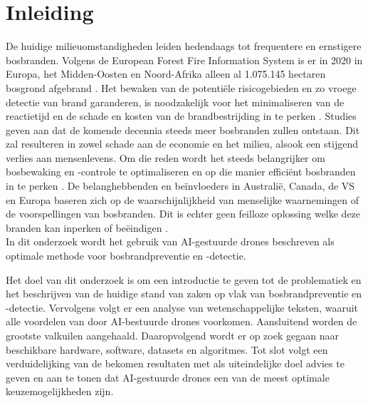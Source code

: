 \documentclass{hogent-article}
\affiliation{
  \textsuperscript{1} \href{mailto:stef.boerjan@student.hogent.be}{stef.boerjan@student.hogent.be}}
\begin{document}
\flushbottom %
\maketitle %
\tableofcontents %
\thispagestyle{empty} %


\section{Inleiding}
De huidige milieuomstandigheden leiden hedendaags tot frequentere en ernstigere bosbranden. Volgens de European Forest Fire Information System is er in 2020 in Europa, het Midden-Oosten en Noord-Afrika alleen al 1.075.145 hectaren bosgrond afgebrand \autocite{Centre2021}. Het bewaken van de potentiële risicogebieden en zo vroege detectie van brand garanderen, is noodzakelijk voor het minimaliseren van de reactietijd en de schade en kosten van de brandbestrijding in te perken \autocite{Alkhatib2014}. Studies geven aan dat de komende decennia steeds meer bosbranden zullen ontstaan. Dit zal resulteren in zowel schade aan de economie en het milieu, alsook een stijgend verlies aan mensenlevens. Om die reden wordt het steeds belangrijker om bosbewaking en -controle te optimaliseren en op die manier efficiënt bosbranden in te perken \autocite{Cruz2016}. 
De belanghebbenden en beïnvloeders in Australië, Canada, de VS en Europa baseren zich op de waarschijnlijkheid van menselijke waarnemingen of de voorspellingen van bosbranden. Dit is echter geen feilloze oplossing welke deze branden kan inperken of beëindigen \autocite{Alkhatib2014}. 
\\ 

In dit onderzoek wordt het gebruik van AI-gestuurde drones beschreven als optimale methode voor bosbrandpreventie en -detectie.

Het doel van dit onderzoek is om een introductie te geven tot de problematiek en het beschrijven van de huidige stand van zaken op vlak van bosbrandpreventie en -detectie. Vervolgens volgt er een analyse van wetenschappelijke teksten, waaruit alle voordelen van door AI-bestuurde drones voorkomen. Aansluitend worden de grootste valkuilen aangehaald. Daaropvolgend wordt er op zoek gegaan naar beschikbare hardware, software, datasets en algoritmes. Tot slot volgt een verduidelijking van de bekomen resultaten met als uiteindelijke doel advies te geven en aan te tonen dat AI-gestuurde drones een van de meest optimale keuzemogelijkheden zijn.
\end{document}
